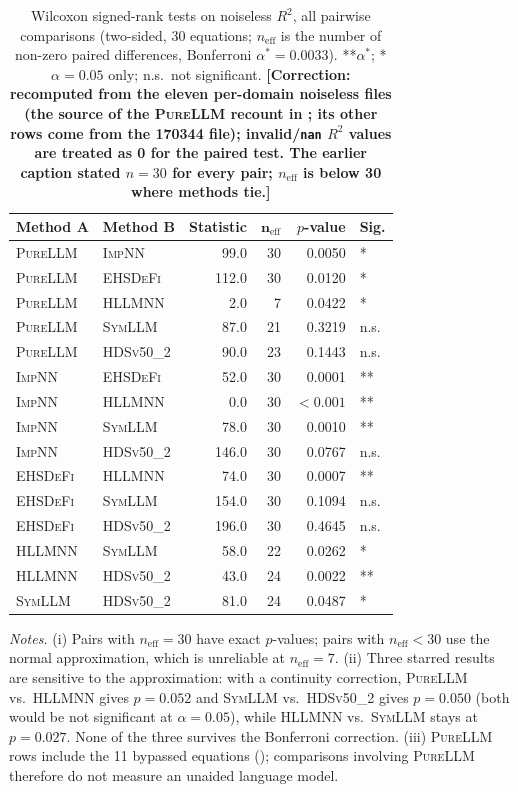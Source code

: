 \documentclass[twoside,11pt]{article}
\newcommand{\PureLLM}{\textsc{PureLLM}}
\newcommand{\INN}{\textsc{ImpNN}}
\newcommand{\EHD}{\textsc{EHSDeFi}}
\newcommand{\HSL}{\textsc{HLLMNN}}
\newcommand{\SEL}{\textsc{SymLLM}}
\newcommand{\HDS}{\textsc{HDSv50\_2}}
\newcommand{\Rsq}{R^{2}}
\begin{document}
\begin{table}[ht]
\centering
\caption{Wilcoxon signed-rank tests on noiseless $\Rsq$, all pairwise comparisons (two-sided,
         30 equations; $n_{\mathrm{eff}}$ is the number of non-zero paired differences,
         Bonferroni $\alpha^*=0.0033$).
         **$\alpha^*$; *$\alpha=0.05$ only; n.s.~not significant.
         \textbf{[Correction: recomputed from the eleven per-domain noiseless files (the source of the
         \PureLLM{} recount in ; its other rows come from the 170344 file); invalid/\texttt{nan} $\Rsq$ values are treated as 0 for the paired test.
         The earlier caption stated $n=30$ for every pair; $n_{\mathrm{eff}}$ is below 30 where
         methods tie.]}}
\label{tab:wilcoxon}
\small
\begin{tabular}{llrrrl}
\toprule
\textbf{Method A} & \textbf{Method B} & \textbf{Statistic} & $\boldsymbol{n_{\mathrm{eff}}}$ &
  \textbf{$p$-value} & \textbf{Sig.} \\
\midrule
\PureLLM & \INN  &  99.0 & 30 &  0.0050  & *  \\
\PureLLM & \EHD  & 112.0 & 30 &  0.0120  & *  \\
\PureLLM & \HSL  &   2.0 &  7 &  0.0422  & *  \\
\PureLLM & \SEL  &  87.0 & 21 &  0.3219  & n.s. \\
\PureLLM & \HDS  &  90.0 & 23 &  0.1443  & n.s. \\
\midrule
\INN     & \EHD  &  52.0 & 30 &  0.0001  & ** \\
\INN     & \HSL  &   0.0 & 30 & $<0.001$ & ** \\
\INN     & \SEL  &  78.0 & 30 &  0.0010  & ** \\
\INN     & \HDS  & 146.0 & 30 &  0.0767  & n.s. \\
\midrule
\EHD     & \HSL  &  74.0 & 30 &  0.0007  & ** \\
\EHD     & \SEL  & 154.0 & 30 &  0.1094  & n.s. \\
\EHD     & \HDS  & 196.0 & 30 &  0.4645  & n.s. \\
\midrule
\HSL     & \SEL  &  58.0 & 22 &  0.0262  & *  \\
\HSL     & \HDS  &  43.0 & 24 &  0.0022  & ** \\
\SEL     & \HDS  &  81.0 & 24 &  0.0487  & *  \\
\bottomrule
\end{tabular}

\smallskip
{\footnotesize \textit{Notes.} (i) Pairs with $n_{\mathrm{eff}}=30$ have exact $p$-values; pairs with
$n_{\mathrm{eff}}<30$ use the normal approximation, which is unreliable at $n_{\mathrm{eff}}=7$.
(ii) Three starred results are sensitive to the approximation: with a continuity correction,
\PureLLM{} vs.\ \HSL{} gives $p=0.052$ and \SEL{} vs.\ \HDS{} gives $p=0.050$ (both would be not significant at
$\alpha=0.05$), while \HSL{} vs.\ \SEL{} stays at $p=0.027$. None of the three survives the Bonferroni correction.
(iii) \PureLLM{} rows include the 11 bypassed equations (); comparisons involving \PureLLM{}
therefore do not measure an unaided language model.}
\end{table}
\end{document}
